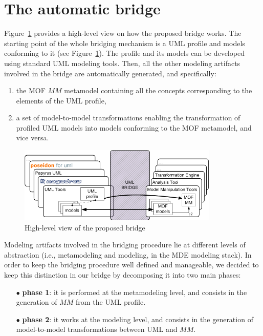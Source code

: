 \section{The automatic bridge}\label{sec:framework}
%

Figure~\ref{fig:overall} provides a high-level view on how the proposed bridge works. The starting point of the whole bridging mechanism is a UML profile and models conforming to it (see Figure~\ref{fig:overall}). The profile and its models can be developed using standard UML modeling tools. Then, all the other modeling artifacts involved in the bridge are automatically generated, and specifically:
\begin{enumerate}
	\item the MOF $MM$ metamodel containing all the concepts corresponding to the elements of the UML profile,
	\item a set of model-to-model transformations enabling the transformation of profiled UML models into models
conforming to the MOF metamodel, and vice versa.
\end{enumerate}


\begin{figure}[htbp]
	\centering
		\includegraphics[width=0.85\textwidth]{figures/overview.png}
	\caption{High-level view of the proposed bridge}
	\label{fig:overall}
\end{figure}


Modeling artifacts involved in the bridging procedure lie at different levels of abstraction
(i.e., metamodeling and modeling, in the MDE modeling stack). In order to keep the bridging procedure well defined and manageable,
we decided to keep this distinction in our bridge by decomposing it into two main phases:
%
\begin{itemize}
	\item[$\bullet$] \textbf{phase 1}: it is performed at the metamodeling level, and consists in the generation of $MM$ from the UML profile.
	\item[$\bullet$] \textbf{phase 2}: it works at the modeling level, and consists in the generation of model-to-model
	transformations between UML and $MM$.
\end{itemize}

